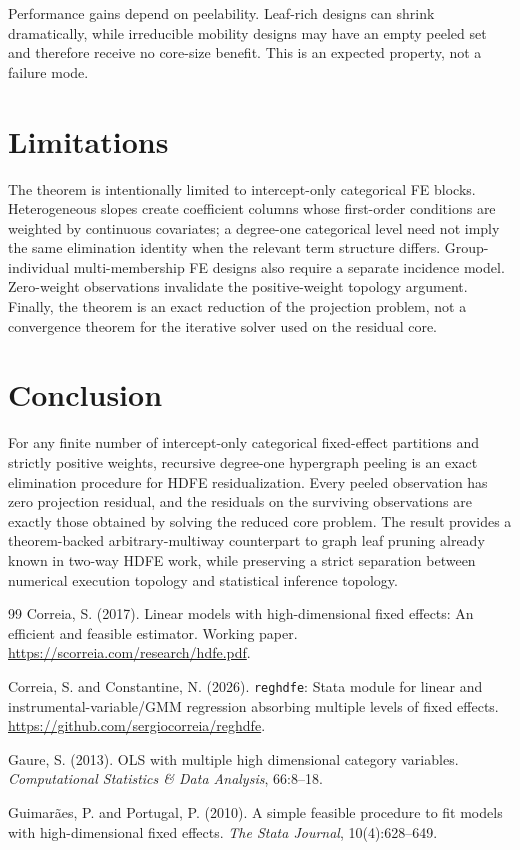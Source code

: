 \documentclass[11pt]{article}
\theoremstyle{definition}
\newcommand{\1}{\mathbf{1}}
\begin{document}
Performance gains depend on peelability. Leaf-rich designs can shrink dramatically, while irreducible mobility designs may have an empty peeled set and therefore receive no core-size benefit. This is an expected property, not a failure mode.

\section{Limitations}

The theorem is intentionally limited to intercept-only categorical FE blocks. Heterogeneous slopes create coefficient columns whose first-order conditions are weighted by continuous covariates; a degree-one categorical level need not imply the same elimination identity when the relevant term structure differs. Group-individual multi-membership FE designs also require a separate incidence model. Zero-weight observations invalidate the positive-weight topology argument. Finally, the theorem is an exact reduction of the projection problem, not a convergence theorem for the iterative solver used on the residual core.

\section{Conclusion}

For any finite number of intercept-only categorical fixed-effect partitions and strictly positive weights, recursive degree-one hypergraph peeling is an exact elimination procedure for HDFE residualization. Every peeled observation has zero projection residual, and the residuals on the surviving observations are exactly those obtained by solving the reduced core problem. The result provides a theorem-backed arbitrary-multiway counterpart to graph leaf pruning already known in two-way HDFE work, while preserving a strict separation between numerical execution topology and statistical inference topology.

\begin{thebibliography}{99}
Correia, S. (2017). Linear models with high-dimensional fixed effects: An efficient and feasible estimator. Working paper. \url{https://scorreia.com/research/hdfe.pdf}.

Correia, S. and Constantine, N. (2026). \texttt{reghdfe}: Stata module for linear and instrumental-variable/GMM regression absorbing multiple levels of fixed effects. \url{https://github.com/sergiocorreia/reghdfe}.

Gaure, S. (2013). OLS with multiple high dimensional category variables. \emph{Computational Statistics \& Data Analysis}, 66:8--18.

Guimar\~aes, P. and Portugal, P. (2010). A simple feasible procedure to fit models with high-dimensional fixed effects. \emph{The Stata Journal}, 10(4):628--649.
\end{thebibliography}
\end{document}
